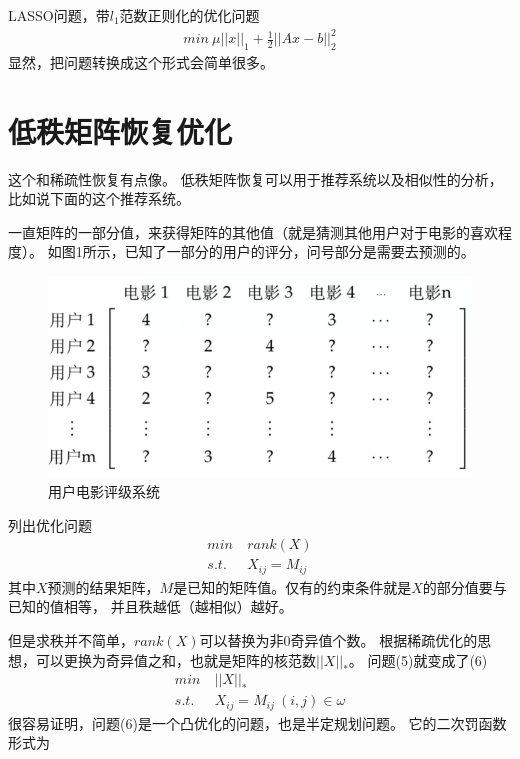 \documentclass{article}
\begin{document}
LASSO问题，带$l_1$范数正则化的优化问题
\begin{equation}
    \begin{aligned}
        min \ \mu ||x||_1+\frac{1}{2}||Ax-b||^2_2
    \end{aligned}
\end{equation}
显然，把问题转换成这个形式会简单很多。
\section{低秩矩阵恢复优化}
这个和稀疏性恢复有点像。
低秩矩阵恢复可以用于推荐系统以及相似性的分析，比如说下面的这个推荐系统。

一直矩阵的一部分值，来获得矩阵的其他值（就是猜测其他用户对于电影的喜欢程度）。
如图1所示，已知了一部分的用户的评分，问号部分是需要去预测的。
\begin{figure}[h]
    \centering
    \includegraphics[scale=0.3]{1.png}
    \caption{用户电影评级系统}
    \end{figure}

列出优化问题
\begin{equation}
    \begin{aligned}
        min \ &rank(X) \\
        s.t. \ &X_{ij}=M_{ij}
    \end{aligned}
\end{equation}
其中$X$预测的结果矩阵，$M$是已知的矩阵值。仅有的约束条件就是$X$的部分值要与已知的值相等，
并且秩越低（越相似）越好。

但是求秩并不简单，$rank(X)$可以替换为非0奇异值个数。
根据稀疏优化的思想，可以更换为奇异值之和，也就是矩阵的核范数$||X||_*$。
问题(5)就变成了(6)
\begin{equation}
    \begin{aligned}
        min \ &||X||_* \\
        s.t. \ &X_{ij}=M_{ij} \ (i,j) \in \omega
    \end{aligned}
\end{equation}
很容易证明，问题(6)是一个凸优化的问题，也是半定规划问题。
它的二次罚函数形式为
\end{document}
